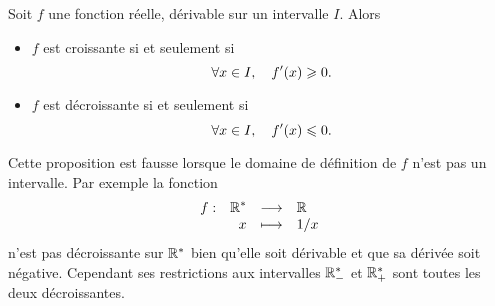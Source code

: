 \documentclass{magnoliaold}
\begin{document}
\begin{proposition}[utile=3]
Soit $f$ une fonction réelle, dérivable sur un intervalle $I$. Alors
\begin{itemize}
\item $f$ est croissante si et seulement si
  \[\forall x\in I ,\quad f'(x)\geqslant 0.\]
\item $f$ est décroissante si et seulement si
  \[\forall x\in I ,\quad f'(x)\leqslant 0.\]
\end{itemize}
\end{proposition}

\begin{remarqueUnique}
\remarque Cette proposition est fausse lorsque le domaine de définition de $f$
  n'est pas un intervalle. Par exemple la fonction
  \[\begin{array}[t]{lrcl} \displaystyle{f} : & \displaystyle{{\mathbb{R}^*}} & \longrightarrow & \displaystyle{\mathbb{R}} \\ & \displaystyle{x} & \longmapsto & \displaystyle{1/x} \end{array}\]
  n'est pas décroissante sur ${\mathbb{R}^*}$ bien qu'elle soit dérivable et que sa dérivée soit
  négative. Cependant ses restrictions
  aux intervalles $\mathbb{R}_-^*$ et $\mathbb{R}_+^*$ sont toutes les deux décroissantes.
\end{remarqueUnique}
\end{document}
